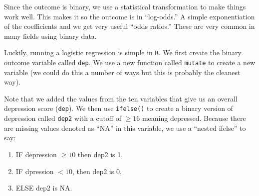 \documentclass[]{tufte-book}
\newenvironment{Shaded}{}{}
\newcommand{\KeywordTok}[1]{\textcolor[rgb]{0.00,0.44,0.13}{\textbf{#1}}}
\newcommand{\DataTypeTok}[1]{\textcolor[rgb]{0.56,0.13,0.00}{#1}}
\newcommand{\DecValTok}[1]{\textcolor[rgb]{0.25,0.63,0.44}{#1}}
\newcommand{\StringTok}[1]{\textcolor[rgb]{0.25,0.44,0.63}{#1}}
\newcommand{\OtherTok}[1]{\textcolor[rgb]{0.00,0.44,0.13}{#1}}
\newcommand{\OperatorTok}[1]{\textcolor[rgb]{0.40,0.40,0.40}{#1}}
\newcommand{\NormalTok}[1]{#1}
\providecommand{\tightlist}{%
  \setlength{\itemsep}{0pt}\setlength{\parskip}{0pt}}
\theoremstyle{definition}
\theoremstyle{definition}
\theoremstyle{remark}
\begin{document}
Since the outcome is binary, we use a statistical transformation to make
things work well. This makes it so the outcome is in ``log-odds.'' A
simple exponentiation of the coefficients and we get very useful ``odds
ratios.'' These are very common in many fields using binary data.

Luckily, running a logistic regression is simple in \texttt{R}. We first
create the binary outcome variable called \texttt{dep}. We use a new
function called \texttt{mutate} to create a new variable (we could do
this a number of ways but this is probably the cleanest way).

\begin{Shaded}
\end{Shaded}

Note that we added the values from the ten variables that give us an
overall depression score (\texttt{dep}). We then use \texttt{ifelse()}
to create a binary version of depression called \texttt{dep2} with a
cutoff of \(\geq 16\) meaning depressed. Because there are missing
values denoted as ``NA'' in this variable, we use a ``nested ifelse'' to
say:

\begin{enumerate}
\def\labelenumi{\arabic{enumi}.}
\tightlist
\item
  IF depression \(\geq 10\) then dep2 is 1,
\item
  IF dpression \(< 10\), then dep2 is 0,
\item
  ELSE dep2 is NA.
\end{enumerate}
\end{document}
